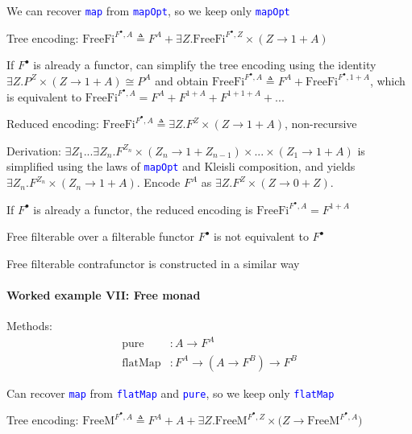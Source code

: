 We can recover \texttt{\textcolor{blue}{\footnotesize{}map}} from
\texttt{\textcolor{blue}{\footnotesize{}mapOpt}}, so we keep only
\texttt{\textcolor{blue}{\footnotesize{}mapOpt}} 

Tree encoding: $\text{FreeFi}^{F^{\bullet},A}\triangleq F^{A}+\exists Z.\text{FreeFi}^{F^{\bullet},Z}\times\left(Z\rightarrow1+A\right)$

If $F^{\bullet}$ is already a functor, can simplify the tree encoding
using the identity $\exists Z.P^{Z}\times\left(Z\rightarrow1+A\right)\cong P^{A}$
and obtain $\text{FreeFi}^{F^{\bullet},A}\triangleq F^{A}+\text{FreeFi}^{F^{\bullet},1+A}$,
which is equivalent to $\text{FreeFi}^{F^{\bullet},A}=F^{A}+F^{1+A}+F^{1+1+A}+...$

Reduced encoding: $\text{FreeFi}^{F^{\bullet},A}\triangleq\exists Z.F^{Z}\times\left(Z\rightarrow1+A\right)$,
non-recursive

Derivation: $\exists Z_{1}...\exists Z_{n}.F^{Z_{n}}\times\left(Z_{n}\rightarrow1+Z_{n-1}\right)\times...\times\left(Z_{1}\rightarrow1+A\right)$
is simplified using the laws of \texttt{\textcolor{blue}{\footnotesize{}mapOpt}}
and Kleisli composition, and yields $\exists Z_{n}.F^{Z_{n}}\times\left(Z_{n}\rightarrow1+A\right)$.
Encode $F^{A}$ as $\exists Z.F^{Z}\times\left(Z\rightarrow0+Z\right)$.

If $F^{\bullet}$ is already a functor, the reduced encoding is $\text{FreeFi}^{F^{\bullet},A}=F^{1+A}$

Free filterable over a filterable functor $F^{\bullet}$ is not equivalent
to $F^{\bullet}$

Free filterable contrafunctor is constructed in a similar way


\paragraph{Worked example VII: Free monad}

Methods:
\begin{align*}
\text{pure} & :A\rightarrow F^{A}\\
\text{flatMap} & :F^{A}\rightarrow(A\rightarrow F^{B})\rightarrow F^{B}
\end{align*}

Can recover \texttt{\textcolor{blue}{\footnotesize{}map}} from \texttt{\textcolor{blue}{\footnotesize{}flatMap}}
and \texttt{\textcolor{blue}{\footnotesize{}pure}}, so we keep only
\texttt{\textcolor{blue}{\footnotesize{}flatMap}} 

Tree encoding: {\footnotesize{}$\text{FreeM}^{F^{\bullet},A}\triangleq F^{A}+A+\exists Z.\text{FreeM}^{F^{\bullet},Z}\times\big(Z\rightarrow\text{FreeM}^{F^{\bullet},A}\big)$}{\footnotesize\par}

